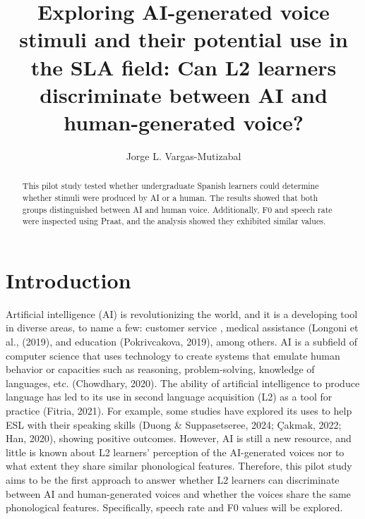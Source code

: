 \documentclass[
  a4paper,
  11pt,
  twocolumn]{article}
\author{}
\date{\vspace{-2.5em}}
\begin{document}
\title{Exploring AI-generated voice stimuli and their potential use in the SLA field: Can L2 learners discriminate between AI and human-generated voice?}
\author{Jorge L. Vargas-Mutizabal}


\maketitle

\begin{abstract}
This pilot study tested whether undergraduate Spanish learners could determine whether stimuli were produced by AI or a human. The results showed that both groups distinguished between AI and human voice. Additionally, F0 and speech rate were inspected using Praat, and the analysis showed they exhibited similar values. 



\end{abstract}



\section{Introduction}

Artificial intelligence (AI) is revolutionizing the world, and it is a
developing tool in diverse areas, to name a few: customer service
\cite{wang2023voice}, medical assistance
\cite{longoni2019resistance}(Longoni et al., (2019), and education
\cite{pokrivcakova2019preparing} (Pokrivcakova, 2019), among others. AI
is a subfield of computer science that uses technology to create systems
that emulate human behavior or capacities such as reasoning,
problem-solving, knowledge of languages,
etc.\cite{chowdhary2020fundamentals} (Chowdhary, 2020). The ability of
artificial intelligence to produce language has led to its use in second
language acquisition (L2) as a tool for practice
\cite{fitria2021use}(Fitria, 2021). For example, some studies have
explored its uses to help ESL with their speaking skills
\cite{duong2024effects}(Duong \& Suppasetseree, 2024;
\cite{ccakmak2022chatbot}Çakmak, 2022; \cite{han2020effects}Han, 2020),
showing positive outcomes. However, AI is still a new resource, and
little is known about L2 learners' perception of the AI-generated voices
nor to what extent they share similar phonological features. Therefore,
this pilot study aims to be the first approach to answer whether L2
learners can discriminate between AI and human-generated voices and
whether the voices share the same phonological features. Specifically,
speech rate and F0 values will be explored.
\end{document}
